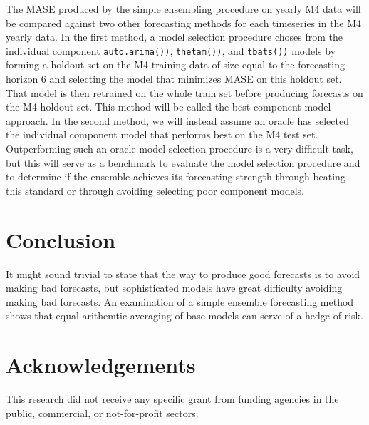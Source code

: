 \documentclass[11pt,3p,review,authoryear]{elsarticle}
\begin{document}
The MASE produced by the simple ensembling procedure on yearly M4 data will be compared against two other forecasting methods for each timeseries in the M4 yearly data. In the first method, a model selection procedure choses from the individual component \texttt{auto.arima())}, \texttt{thetam())}, and \texttt{tbats())} models by forming a holdout set on the M4 training data of size equal to the forecasting horizon 6 and selecting the model that minimizes MASE on this holdout set. That model is then retrained on the whole train set before producing forecasts on the M4 holdout set. This method will be called the best component model approach. In the second method, we will instead assume an oracle has selected the individual component model that performs best on the M4 test set. Outperforming such an oracle model selection procedure is a very difficult task, but this will serve as a benchmark to evaluate the model selection procedure and to determine if the ensemble achieves its forecasting strength through beating this standard or through avoiding selecting poor component models.


\section{Conclusion}
It might sound trivial to state that the way to produce good forecasts is to avoid making bad forecasts, but sophisticated models have great difficulty avoiding making bad forecasts. An examination of a simple ensemble forecasting method shows that equal arithemtic averaging of base models can serve of a hedge of risk.

\section*{Acknowledgements}

This research did not receive any specific grant from funding agencies in the public, commercial, or not-for-profit sectors.



\end{document}
